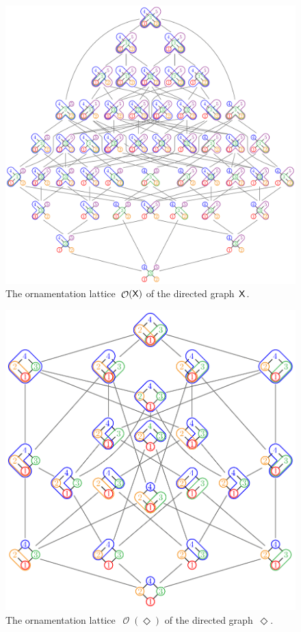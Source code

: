 \documentclass{amsart}
\theoremstyle{definition}
\renewcommand{\c}[1]{\mathcal{#1}} %
\DeclareMathOperator{\Orn}{\c{O}}  %
\newcommand{\Xgraph}{\sf X} %
\newcommand{\Dgraph}{\boldsymbol{\Diamond}} %
\begin{document}
\begin{figure}[p]
	\centerline{\includegraphics[scale=.8]{ornamentationsX}}
	\caption{The ornamentation lattice~$\Orn(\Xgraph)$ of the directed graph~$\Xgraph$.}
	\label{fig:ornamentationsX}
\end{figure}

\begin{figure}
	\centerline{\includegraphics[scale=.8]{ornamentationsD}}
	\caption{The ornamentation lattice~$\Orn(\Dgraph)$ of the directed graph~$\Dgraph$.}
	\label{fig:ornamentationsD}
\end{figure}
\end{document}
